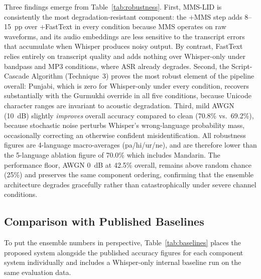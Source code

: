 \documentclass[conference]{IEEEtran}
\begin{document}
Three findings emerge from Table~\ref{tab:robustness}. First, MMS-LID is consistently the most degradation-resistant component: the +MMS step adds 8--15~pp over +FastText in every condition because MMS operates on raw waveforms, and its audio embeddings are less sensitive to the transcript errors that accumulate when Whisper produces noisy output. By contrast, FastText relies entirely on transcript quality and adds nothing over Whisper-only under bandpass and MP3 conditions, where ASR already degrades. Second, the Script-Cascade Algorithm (Technique~3) proves the most robust element of the pipeline overall: Punjabi, which is zero for Whisper-only under every condition, recovers substantially with the Gurmukhi override in all five conditions, because Unicode character ranges are invariant to acoustic degradation. Third, mild AWGN (10~dB) slightly \textit{improves} overall accuracy compared to clean (70.8\% vs.\ 69.2\%), because stochastic noise perturbs Whisper's wrong-language probability mass, occasionally correcting an otherwise confident misidentification. All robustness figures are 4-language macro-averages (pa/hi/ur/ne), and are therefore lower than the 5-language ablation figure of 70.0\% which includes Mandarin. The performance floor, AWGN 0~dB at 42.5\% overall, remains above random chance (25\%) and preserves the same component ordering, confirming that the ensemble architecture degrades gracefully rather than catastrophically under severe channel conditions.

\subsection{Comparison with Published Baselines}

To put the ensemble numbers in perspective, Table~\ref{tab:baselines} places the proposed system alongside the published accuracy figures for each component system individually and includes a Whisper-only internal baseline run on the same evaluation data.
\end{document}
